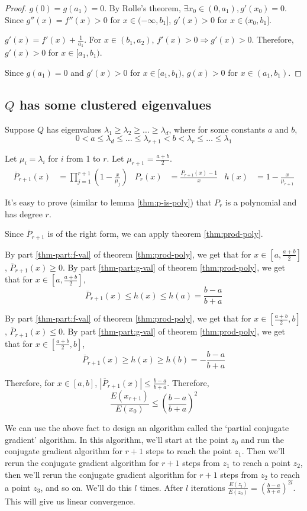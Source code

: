 \begin{proof}
$g(0) = g(a_1) = 0$. By Rolle's theorem,
$\exists x_0 \in (0, a_1), g'(x_0) = 0$.
Since $g''(x) = f''(x) > 0$ for $x \in (-\infty, b_1]$,
$g'(x) > 0$ for $x \in (x_0, b_1]$.

$g'(x) = f'(x) + \frac{1}{a_1}$.
For $x \in (b_1, a_2)$, $f'(x) > 0 \Rightarrow g'(x) > 0$.
Therefore, $g'(x) > 0$ for $x \in [a_1, b_1)$.

Since $g(a_1) = 0$ and $g'(x) > 0$ for $x \in [a_1, b_1)$,
$g(x) > 0$ for $x \in (a_1, b_1)$.
\end{proof}

\subsection{\texorpdfstring{$Q$}{Q} has some clustered eigenvalues}

Suppose $Q$ has eigenvalues $\lambda_1 \ge \lambda_2 \ge \ldots \ge \lambda_d$,
where for some constants $a$ and $b$,
\[ 0 < a \le \lambda_d \le \ldots \le \lambda_{r+1} < b < \lambda_r \le \ldots \le \lambda_1 \]

Let $\mu_i = \lambda_i$ for $i$ from 1 to $r$.
Let $\mu_{r+1} = \frac{a+b}{2}$.
\begin{align*}
\overline{P}_{r+1}(x) &= \prod_{j=1}^{r+1} \left( 1 - \frac{x}{\mu_j} \right)
& P_{r}(x) &= \frac{P_{r+1}(x) - 1}{x}
& h(x) &= 1 - \frac{x}{\mu_{r+1}}
\end{align*}

It's easy to prove (similar to lemma \ref{thm:p-is-poly}) that $P_{r}$ is a polynomial and has degree $r$.

Since $\overline{P}_{r+1}$ is of the right form, we can apply theorem \ref{thm:prod-poly}.

By part \ref{thm-part:f-val} of theorem \ref{thm:prod-poly},
we get that for $x \in [a, \frac{a+b}{2}]$, $\overline{P}_{r+1}(x) \ge 0$.
By part \ref{thm-part:g-val} of theorem \ref{thm:prod-poly},
we get that for $x \in [a, \frac{a+b}{2}]$,
\[ \overline{P}_{r+1}(x) \le h(x) \le h(a) = \frac{b-a}{b+a} \]

By part \ref{thm-part:f-val} of theorem \ref{thm:prod-poly},
we get that for $x \in [\frac{a+b}{2}, b]$, $\overline{P}_{r+1}(x) \le 0$.
By part \ref{thm-part:g-val} of theorem \ref{thm:prod-poly},
we get that for $x \in [\frac{a+b}{2}, b]$,
\[ \overline{P}_{r+1}(x) \ge h(x) \ge h(b) = - \frac{b-a}{b+a} \]

Therefore, for $x \in [a, b]$, $\left| \overline{P}_{r+1}(x) \right| \le \frac{b-a}{b+a}$.
Therefore,
\[ \frac{E(x_{r+1})}{E(x_0)} \le \left( \frac{b-a}{b+a} \right)^2 \]

We can use the above fact to design an algorithm called the `partial conjugate gradient' algorithm.
In this algorithm, we'll start at the point $z_0$ and run
the conjugate gradient algorithm for $r+1$ steps to reach the point $z_1$.
Then we'll rerun the conjugate gradient algorithm for $r+1$ steps from $z_1$ to reach a point $z_2$,
then we'll rerun the conjugate gradient algorithm for $r+1$ steps from $z_2$ to reach a point $z_3$, and so on.
We'll do this $l$ times. After $l$ iterations $\frac{E(z_l)}{E(z_0)} = \left( \frac{b-a}{b+a} \right)^{2l}$.
This will give us linear convergence.


